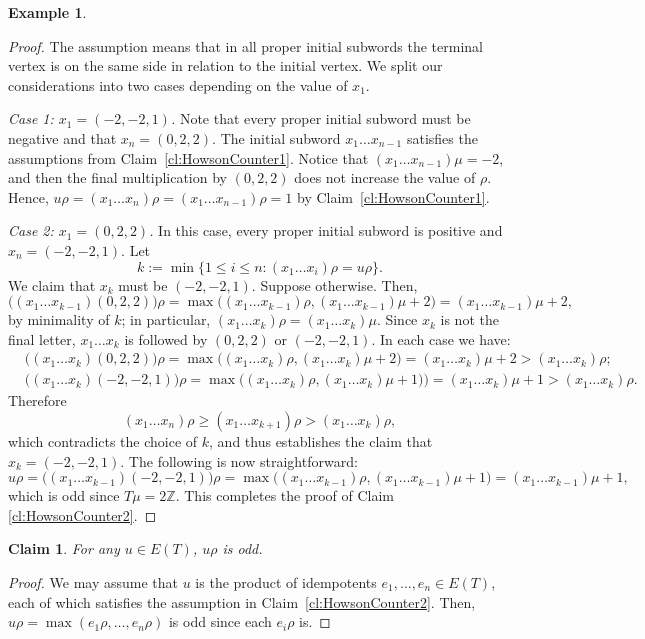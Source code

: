 \documentclass[reqno]{amsart}
\theoremstyle{plain}
\newtheorem{claim}{Claim}[lem]
\theoremstyle{definition}
\newtheorem{ex}[lem]{Example}
\numberwithin{equation}{section}
\begin{document}
\begin{ex}
\begin{proof}
The assumption means that in all proper initial subwords the terminal vertex is on the same side in 
relation to the initial vertex. We split our considerations into two cases depending on the value of $x_1$.

\emph{Case 1: $x_1 = (-2, -2, 1)$.} Note that every proper initial subword must be negative and that $x_n = (0, 2, 2)$. The initial subword $x_1\dots x_{n-1}$ satisfies the assumptions from Claim~\ref{cl:HowsonCounter1}. Notice that $(x_1\dots x_{n-1})\mu = -2$, and then the final multiplication by $(0, 2, 2)$ does not increase the value of $\rho$. Hence, $u\rho = (x_1\dots x_n)\rho = (x_1\dots x_{n-1})\rho = 1$ by Claim~\ref{cl:HowsonCounter1}.

\emph{Case 2: $x_1 = (0, 2, 2)$.} In this case, every proper initial subword is positive and $x_n = (-2, -2, 1)$. Let 
\[
k := \min\{1\leq i \leq n: (x_1\dots x_i)\rho = u\rho\}.
\]
We claim that $x_k$ must be $(-2, -2, 1)$. Suppose otherwise. Then, 
\[
\bigl((x_1\dots x_{k-1})(0, 2, 2)\bigr)\rho = \max\bigl((x_1\dots x_{k-1})\rho, (x_1\dots x_{k-1})\mu + 2\bigr) = (x_1\dots x_{k-1})\mu + 2,
\]
by minimality of $k$; in particular, $(x_1\dots x_k)\rho = (x_1\dots x_k)\mu$. Since $x_k$ is not the final letter, $x_1\dots x_k$ is followed by $(0, 2, 2)$ or $(-2, -2 ,1)$. 
In each case we have:
\begin{align*}
    &\bigl((x_1\dots x_k)(0, 2, 2)\bigr)\rho = \max\bigl((x_1\dots x_k)\rho, (x_1\dots x_k)\mu + 2\bigr) = (x_1\dots x_k)\mu + 2 > (x_1\dots x_k)\rho;\\
    &\bigl((x_1\dots x_k)(-2, -2, 1)\bigr)\rho = \max\bigl((x_1\dots x_k)\rho, (x_1\dots x_k)\mu+1)\bigr) = (x_1\dots x_k)\mu+1>(x_1\dots x_k)\rho.
\end{align*}
Therefore
\[
(x_1\dots x_n)\rho\geq (x_1\dots x_{k+1})\rho> (x_1\dots x_k)\rho,
\]
which contradicts the choice of $k$, and thus establishes the claim that $x_k = (-2, -2, 1)$.  
The following is now straightforward:
\[
u\rho = \bigl((x_1\dots x_{k-1})(-2, -2, 1)\bigr)\rho = \max\bigl((x_1\dots x_{k-1})\rho, (x_1\dots x_{k-1})\mu+1\bigr) = (x_1\dots x_{k-1})\mu + 1,
\]
which is odd since $T\mu = 2\mathbb{Z}$. This completes the proof of Claim \ref{cl:HowsonCounter2}.
\end{proof}

\begin{claim}
\label{cl:HowsonCounter3}
For any $u\in E(T)$, $u\rho$ is odd.
\end{claim}
\begin{proof}
We may assume that $u$ is the product of idempotents $e_1, \dots, e_n\in E(T)$, each of which satisfies the assumption in Claim~\ref{cl:HowsonCounter2}. Then, $u\rho = \max(e_1\rho, \dots ,e_n\rho)$ is odd since each $e_i\rho$ is.
\end{proof}


\end{ex}
\end{document}

